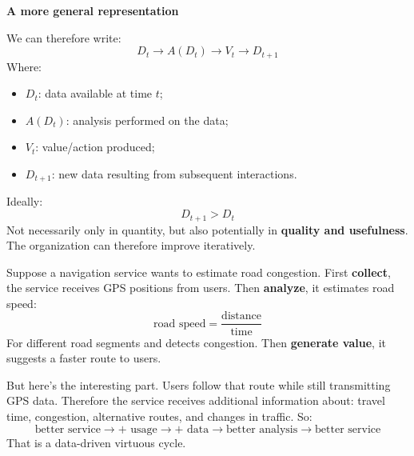 \highspace
\begin{flushleft}
    \textcolor{Green3}{ \textbf{A more general representation}}
\end{flushleft}
We can therefore write:
\begin{equation*}
    D_t
    \rightarrow
    A(D_t)
    \rightarrow
    V_t
    \rightarrow
    D_{t+1}
\end{equation*}
Where:
\begin{itemize}
    \item $D_t$: data available at time $t$;
    \item $A(D_t)$: analysis performed on the data;
    \item $V_t$: value/action produced;
    \item $D_{t+1}$: new data resulting from subsequent interactions.
\end{itemize}
Ideally:
\begin{equation*}
    D_{t+1} > D_t
\end{equation*}
Not necessarily only in quantity, but also potentially in \textbf{quality and usefulness}. The organization can therefore improve iteratively.

\highspace
\begin{examplebox}
    Suppose a navigation service wants to estimate road congestion. First \textbf{collect}, the service receives GPS positions from users. Then \textbf{analyze}, it estimates road speed:
    \begin{equation*}
        \text{road speed}
        =
        \frac{\text{distance}}{\text{time}}
    \end{equation*}
    For different road segments and detects congestion. Then \textbf{generate value}, it suggests a faster route to users.

    \highspace
    But here's the interesting part. Users follow that route while still transmitting GPS data. Therefore the service receives additional information about: travel time, congestion, alternative routes, and changes in traffic. So:
    \begin{equation*}
        \text{better service}
        \rightarrow
        +\text{ usage}
        \rightarrow
        +\text{ data}
        \rightarrow
        \text{better analysis}
        \rightarrow
        \text{better service}
    \end{equation*}
    That is a data-driven virtuous cycle.
\end{examplebox}

